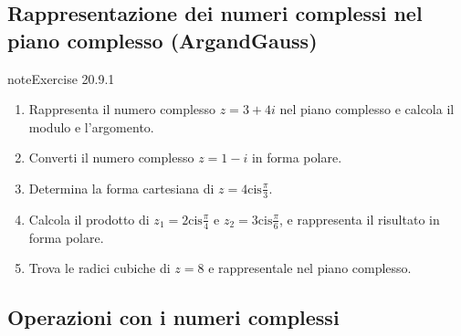 \documentclass[letterpaper,10pt,italian]{jupyterBook}
\begin{document}
\subsection{Rappresentazione dei numeri complessi nel piano complesso (Argand\sphinxhyphen{}Gauss)}
\label{\detokenize{ch/algebra/complex-algebra-problems:rappresentazione-dei-numeri-complessi-nel-piano-complesso-argand-gauss}}\label{\detokenize{ch/algebra/complex-algebra-problems:math-hs-algebra-complex-problems-complex-plane}} \label{exercise:ch/algebra/complex-algebra-problems-exercise-0}

\begin{sphinxadmonition}{note}{Exercise 20.9.1}


\begin{enumerate}
%
\item {} 
\sphinxAtStartPar
Rappresenta il numero complesso \( z = 3 + 4i \) nel piano complesso e calcola il modulo e l’argomento.

\item {} 
\sphinxAtStartPar
Converti il numero complesso \( z = 1 - i \) in forma polare.

\item {} 
\sphinxAtStartPar
Determina la forma cartesiana di \( z = 4 \text{cis}\frac{\pi}{3} \).

\item {} 
\sphinxAtStartPar
Calcola il prodotto di \( z_1 = 2 \text{cis}\frac{\pi}{4} \) e \( z_2 = 3 \text{cis}\frac{\pi}{6} \), e rappresenta il risultato in forma polare.

\item {} 
\sphinxAtStartPar
Trova le radici cubiche di \( z = 8 \) e rappresentale nel piano complesso.

\end{enumerate}
\end{sphinxadmonition}




\subsection{Operazioni con i numeri complessi}
\label{\detokenize{ch/algebra/complex-algebra-problems:operazioni-con-i-numeri-complessi}}\label{\detokenize{ch/algebra/complex-algebra-problems:math-hs-algebra-complex-problems-operations}} \label{exercise:ch/algebra/complex-algebra-problems-exercise-1}
\end{document}
